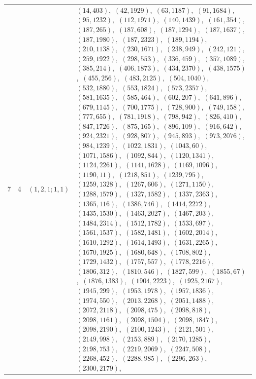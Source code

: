 \documentclass[11pt]{article}
\begin{document}
\begin{longtable}{@{}rrl>{\raggedright\arraybackslash}p{}@{}}
7 & 4 & $(1,2,1;1,1)$ & $(14,403)$,\allowbreak\ $(42,1929)$,\allowbreak\ $(63,1187)$,\allowbreak\ $(91,1684)$,\allowbreak\ $(95,1232)$,\allowbreak\ $(112,1971)$,\allowbreak\ $(140,1439)$,\allowbreak\ $(161,354)$,\allowbreak\ $(187,265)$,\allowbreak\ $(187,608)$,\allowbreak\ $(187,1294)$,\allowbreak\ $(187,1637)$,\allowbreak\ $(187,1980)$,\allowbreak\ $(187,2323)$,\allowbreak\ $(189,1194)$,\allowbreak\ $(210,1138)$,\allowbreak\ $(230,1671)$,\allowbreak\ $(238,949)$,\allowbreak\ $(242,121)$,\allowbreak\ $(259,1922)$,\allowbreak\ $(298,553)$,\allowbreak\ $(336,459)$,\allowbreak\ $(357,1089)$,\allowbreak\ $(385,214)$,\allowbreak\ $(406,1873)$,\allowbreak\ $(434,2370)$,\allowbreak\ $(438,1575)$,\allowbreak\ $(455,256)$,\allowbreak\ $(483,2125)$,\allowbreak\ $(504,1040)$,\allowbreak\ $(532,1880)$,\allowbreak\ $(553,1824)$,\allowbreak\ $(573,2357)$,\allowbreak\ $(581,1635)$,\allowbreak\ $(585,464)$,\allowbreak\ $(602,207)$,\allowbreak\ $(641,896)$,\allowbreak\ $(679,1145)$,\allowbreak\ $(700,1775)$,\allowbreak\ $(728,900)$,\allowbreak\ $(749,158)$,\allowbreak\ $(777,655)$,\allowbreak\ $(781,1918)$,\allowbreak\ $(798,942)$,\allowbreak\ $(826,410)$,\allowbreak\ $(847,1726)$,\allowbreak\ $(875,165)$,\allowbreak\ $(896,109)$,\allowbreak\ $(916,642)$,\allowbreak\ $(924,2321)$,\allowbreak\ $(928,807)$,\allowbreak\ $(945,893)$,\allowbreak\ $(973,2076)$,\allowbreak\ $(984,1239)$,\allowbreak\ $(1022,1831)$,\allowbreak\ $(1043,60)$,\allowbreak\ $(1071,1586)$,\allowbreak\ $(1092,844)$,\allowbreak\ $(1120,1341)$,\allowbreak\ $(1124,2261)$,\allowbreak\ $(1141,1628)$,\allowbreak\ $(1169,1096)$,\allowbreak\ $(1190,11)$,\allowbreak\ $(1218,851)$,\allowbreak\ $(1239,795)$,\allowbreak\ $(1259,1328)$,\allowbreak\ $(1267,606)$,\allowbreak\ $(1271,1150)$,\allowbreak\ $(1288,1579)$,\allowbreak\ $(1327,1582)$,\allowbreak\ $(1337,2363)$,\allowbreak\ $(1365,116)$,\allowbreak\ $(1386,746)$,\allowbreak\ $(1414,2272)$,\allowbreak\ $(1435,1530)$,\allowbreak\ $(1463,2027)$,\allowbreak\ $(1467,203)$,\allowbreak\ $(1484,2314)$,\allowbreak\ $(1512,1782)$,\allowbreak\ $(1533,697)$,\allowbreak\ $(1561,1537)$,\allowbreak\ $(1582,1481)$,\allowbreak\ $(1602,2014)$,\allowbreak\ $(1610,1292)$,\allowbreak\ $(1614,1493)$,\allowbreak\ $(1631,2265)$,\allowbreak\ $(1670,1925)$,\allowbreak\ $(1680,648)$,\allowbreak\ $(1708,802)$,\allowbreak\ $(1729,1432)$,\allowbreak\ $(1757,557)$,\allowbreak\ $(1778,2216)$,\allowbreak\ $(1806,312)$,\allowbreak\ $(1810,546)$,\allowbreak\ $(1827,599)$,\allowbreak\ $(1855,67)$,\allowbreak\ $(1876,1383)$,\allowbreak\ $(1904,2223)$,\allowbreak\ $(1925,2167)$,\allowbreak\ $(1945,299)$,\allowbreak\ $(1953,1978)$,\allowbreak\ $(1957,1836)$,\allowbreak\ $(1974,550)$,\allowbreak\ $(2013,2268)$,\allowbreak\ $(2051,1488)$,\allowbreak\ $(2072,2118)$,\allowbreak\ $(2098,475)$,\allowbreak\ $(2098,818)$,\allowbreak\ $(2098,1161)$,\allowbreak\ $(2098,1504)$,\allowbreak\ $(2098,1847)$,\allowbreak\ $(2098,2190)$,\allowbreak\ $(2100,1243)$,\allowbreak\ $(2121,501)$,\allowbreak\ $(2149,998)$,\allowbreak\ $(2153,889)$,\allowbreak\ $(2170,1285)$,\allowbreak\ $(2198,753)$,\allowbreak\ $(2219,2069)$,\allowbreak\ $(2247,508)$,\allowbreak\ $(2268,452)$,\allowbreak\ $(2288,985)$,\allowbreak\ $(2296,263)$,\allowbreak\ $(2300,2179)$,\allowbreak\ 
\end{longtable}
\end{document}
